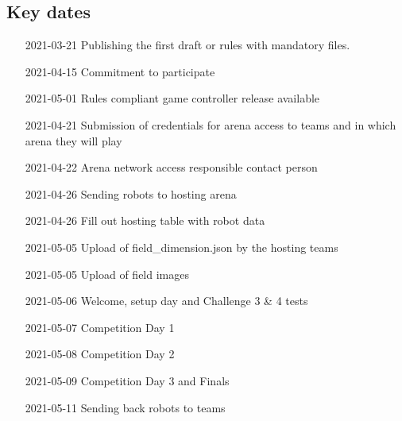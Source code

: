 \subsection{Key dates}

\begin{itemize}[leftmargin=*,labelsep=0.7cm, labelindent=2cm]
    \item [2021-03-21] Publishing the first draft or rules with mandatory files.
    \item [2021-04-15] Commitment to participate
    \item [2021-05-01] Rules compliant game controller release available
    \item [2021-04-21] Submission of credentials for arena access to teams and in which arena they will play
    \item [2021-04-22] Arena network access responsible contact person
    \item [2021-04-26] Sending robots to hosting arena
    \item [2021-04-26] Fill out hosting table with robot data
    \item [2021-05-05] Upload of field\_dimension.json by the hosting teams
    \item [2021-05-05] Upload of field images
    \item [2021-05-06] Welcome, setup day and Challenge 3 \& 4 tests
    \item [2021-05-07] Competition Day 1
    \item [2021-05-08] Competition Day 2
    \item [2021-05-09] Competition Day 3 and Finals
    \item [2021-05-11] Sending back robots to teams
\end{itemize}
